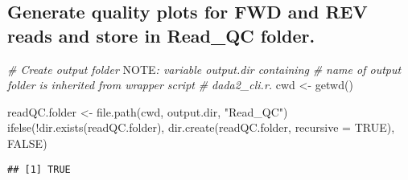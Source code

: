 \documentclass[
]{article}
\newenvironment{Shaded}{\begin{snugshade}}{\end{snugshade}}
\newcommand{\AlertTok}[1]{\textcolor[rgb]{0.94,0.16,0.16}{#1}}
\newcommand{\AttributeTok}[1]{\textcolor[rgb]{0.77,0.63,0.00}{#1}}
\newcommand{\CommentTok}[1]{\textcolor[rgb]{0.56,0.35,0.01}{\textit{#1}}}
\newcommand{\ConstantTok}[1]{\textcolor[rgb]{0.00,0.00,0.00}{#1}}
\newcommand{\FunctionTok}[1]{\textcolor[rgb]{0.00,0.00,0.00}{#1}}
\newcommand{\NormalTok}[1]{#1}
\newcommand{\OtherTok}[1]{\textcolor[rgb]{0.56,0.35,0.01}{#1}}
\newcommand{\SpecialCharTok}[1]{\textcolor[rgb]{0.00,0.00,0.00}{#1}}
\newcommand{\StringTok}[1]{\textcolor[rgb]{0.31,0.60,0.02}{#1}}
\begin{document}
\hypertarget{generate-quality-plots-for-fwd-and-rev-reads-and-store-in-read_qc-folder.}{%
\subsection{Generate quality plots for FWD and REV reads and store in
Read\_QC
folder.}\label{generate-quality-plots-for-fwd-and-rev-reads-and-store-in-read_qc-folder.}}

\begin{Shaded}
\begin{Highlighting}[]
\CommentTok{\# Create output folder }\AlertTok{NOTE}\CommentTok{: variable \textquotesingle{}output.dir\textquotesingle{} containing}
\CommentTok{\# name of output folder is inherited from wrapper script}
\CommentTok{\# dada2\_cli.r.}
\NormalTok{cwd }\OtherTok{\textless{}{-}} \FunctionTok{getwd}\NormalTok{()}

\NormalTok{readQC.folder }\OtherTok{\textless{}{-}} \FunctionTok{file.path}\NormalTok{(cwd, output.dir, }\StringTok{"Read\_QC"}\NormalTok{)}
\FunctionTok{ifelse}\NormalTok{(}\SpecialCharTok{!}\FunctionTok{dir.exists}\NormalTok{(readQC.folder), }\FunctionTok{dir.create}\NormalTok{(readQC.folder, }
    \AttributeTok{recursive =} \ConstantTok{TRUE}\NormalTok{), }\ConstantTok{FALSE}\NormalTok{)}
\end{Highlighting}
\end{Shaded}

\begin{verbatim}
## [1] TRUE
\end{verbatim}
\end{document}
